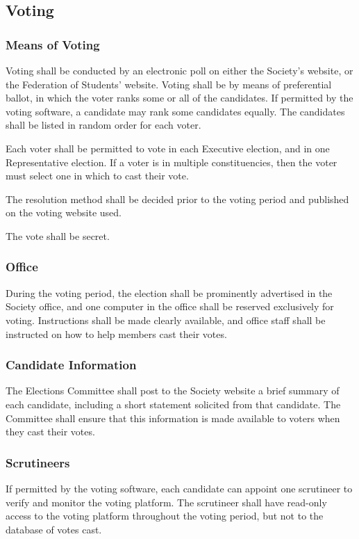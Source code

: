 \subsection{Voting}
\subsubsection{Means of Voting}
Voting shall be conducted by an electronic poll on either the Society’s website, or the Federation of Students’ website. Voting shall be by means of preferential ballot, in which the voter ranks some or all of the candidates. If permitted by the voting software, a candidate may rank some candidates equally. The candidates shall be listed in random order for each voter.

Each voter shall be permitted to vote in each Executive election, and in one Representative election. If a voter is in multiple constituencies, then the voter must select one in which to cast their vote.

The resolution method shall be decided prior to the voting period and published on the voting website used.

The vote shall be secret.


\subsubsection{Office}
During the voting period, the election shall be prominently advertised in the
Society office, and one computer in the office shall be reserved exclusively for
voting. Instructions shall be made clearly available, and office staff shall
be instructed on how to help members cast their votes.

\subsubsection{Candidate Information}
The Elections Committee shall post to the Society website a brief summary of
each candidate, including a short statement solicited from that candidate. The
Committee shall ensure that this information is made available to voters when
they cast their votes.

\subsubsection{Scrutineers}
If permitted by the voting software, each candidate can appoint one scrutineer to verify and monitor the voting
platform. The scrutineer shall have read-only access to the voting platform
throughout the voting period, but not to the database of votes cast.


